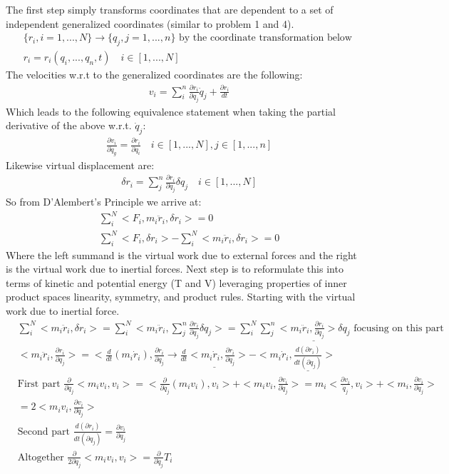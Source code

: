 \documentclass{article}
\begin{document}
The first step simply transforms coordinates that are dependent to a set of independent generalized coordinates (similar to problem 1 and 4).
\begin{align*}
    & \{r_i, i = 1, ..., N\} \to \{q_j, j = 1,..., n\} \text{ by the coordinate transformation below } \\
    & r_i = r_i(q_i, ..., q_n, t) \quad i \in [1, ..., N]
\end{align*}
The velocities w.r.t to the generalized coordinates are the following:
\begin{align*}
    & v_i = \sum_i^n \frac{\partial r_i}{\partial q_j} \dot{q}_j + \frac{\partial r_i}{dt} 
\end{align*}
Which leads to the following equivalence statement when taking the partial derivative of the above w.r.t. $\dot{q}_j$:
\begin{align*}
    & \frac{\partial v_i}{\partial \dot{q}_g} = \frac{\partial r_i}{\partial q_i} \quad i \in [1, ..., N], j \in [1, ..., n]
\end{align*}
Likewise virtual displacement are:
\begin{align*}
    & \delta r_i = \sum_j^n \frac{\partial r_i}{\partial q_j} \delta q_j \quad i \in [1, ..., N]
\end{align*}
So from D'Alembert's Principle we arrive at:
\begin{align*}
    & \sum_i^N <F_i, m_i \ddot{r}_i, \delta r_i> = 0 \\
    & \sum_i^N <F_i, \delta r_i> - \sum_i^N<m_i \ddot{r}_i, \delta r_i> = 0
\end{align*}
Where the left summand is the virtual work due to external forces and the right is the virtual work due to inertial forces. Next step is to reformulate this into terms of kinetic and potential energy (T and V) leveraging properties of inner product spaces linearity, symmetry, and product rules. Starting with the virtual work due to inertial force.
\begin{align*}
    & \sum_i^N <m_i \ddot{r}_i, \delta r_i> = \sum_i^N <m_i \ddot{r}_i, \sum_j^n \frac{\partial r_i}{\partial q_j} \delta q_j> = \sum_i^N \sum_j^n \underline{<m_i \ddot{r}_i, \frac{\partial r_i}{\partial q_j}> \delta q_j} \text{ focusing on this part} \\
    & <m_i \ddot{r}_i, \frac{\partial r_i}{\partial q_j}> = <\frac{d}{dt}(m_i \dot{r}_i), \frac{\partial r_i}{\partial q_j} \to \underline{\frac{d}{dt}<m_i \dot{r}_i, \frac{\partial r_i}{\partial q_j}>} - <m_i \dot{r}_i, \underline{\frac{d(\partial r_i)}{dt(\partial q_j)}}> \\
    & \text{First part } \frac{\partial}{\partial \dot{q}_j}<m_i v_i, v_i> = <\frac{\partial}{\partial \dot{q}_j}(m_i v_i), v_i> + <m_i v_i, \frac{\partial v_i}{\partial \dot{q}_j}> = m_i <\frac{\partial v_i}{\dot{q}_j},v_i> + <m_i, \frac{\partial v_i}{\partial \dot{q}_j}> \\
    & = 2 <m_i v_i, \frac{\partial v_i}{\partial \dot{q}_j}>  \\
    & \text{Second part }\frac{d(\partial r_i)}{dt(\partial q_j)} = \frac{\partial v_i}{\partial q_j} \\
    & \text{Altogether } \frac{\partial}{2 \partial \dot{q}_j} <m_i v_i, v_i> = \frac{\partial}{\partial \dot{q}_j}T_i
\end{align*}
\end{document}

